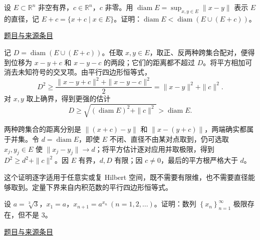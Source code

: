 \documentclass[12pt,fontset=fandol]{ctexart}
\begin{document}
\begin{example}[来源序号5]\label{ex:ch03-15th-A:5}\label{pr:ch03-15th-A:5}

设 $E \subset \mathbb{R}^n$ 非空有界，$c \in \mathbb{R}^n$，$c$ 非零。用 $\operatorname{diam} E = \sup_{x,y \in E} \|x - y\|$ 表示 $E$ 的直径，记 $E + c = \{x + c \mid x \in E\}$。证明：$\operatorname{diam} E < \operatorname{diam}(E \cup (E + c))$。

\par\href{https://github.com/lzxcr/cmc-mathematics/blob/64916fa1fdbc3e444a652eca204d5669058ee321/src/problems/preliminary/15/05.md}{题目与来源条目}

\end{example}

\begin{solve}\label{ans:ch03-15th-A:5}

记 $D=\operatorname{diam}(E\cup(E+c))$。任取 $x,y\in E$，取正、反两种跨集合配对，便得到位移为 $x-y+c$ 和 $x-y-c$ 的两段；它们的距离都不超过 $D$。将平方相加可消去未知符号的交叉项。由平行四边形恒等式，
\[
D^2\geq\frac{\|x-y+c\|^2+\|x-y-c\|^2}{2}
=\|x-y\|^2+\|c\|^2.
\]
对 $x,y$ 取上确界，得到更强的估计
\[
D\geq\sqrt{(\operatorname{diam}E)^2+\|c\|^2}
>\operatorname{diam}E.
\]

两种跨集合的距离分别是 $\|(x+c)-y\|$ 和 $\|x-(y+c)\|$，两端确实都属于并集。令 $d=\operatorname{diam}E$，即使 $E$ 不闭、直径不由某对点取到，仍可选取 $x_j,y_j\in E$ 使 $\|x_j-y_j\|\to d$；将平方估计逐对应用并取极限，得到 $D^2\ge d^2+\|c\|^2$。因 $E$ 有界，$d,D$ 有限；因 $c\ne0$，最后的平方根严格大于 $d$。

\end{solve}

\begin{remark}[方法与条件]这个证明逐字适用于任意实或复 Hilbert 空间，既不需要有限维，也不需要直径能够取到。定量下界来自内积范数的平行四边形恒等式。\end{remark}

\begin{example}[来源序号6]\label{ex:ch03-15th-A:6}\label{pr:ch03-15th-A:6}

设 $a = \sqrt[3]{3}$，$x_1 = a$，$x_{n+1} = a^{x_n}\ (n = 1, 2, \ldots)$。证明：数列 $\left\{x_n\right\}_{n=1}^{\infty}$ 极限存在，但不是 3。

\par\href{https://github.com/lzxcr/cmc-mathematics/blob/64916fa1fdbc3e444a652eca204d5669058ee321/src/problems/preliminary/15/06.md}{题目与来源条目}

\end{example}
\end{document}
